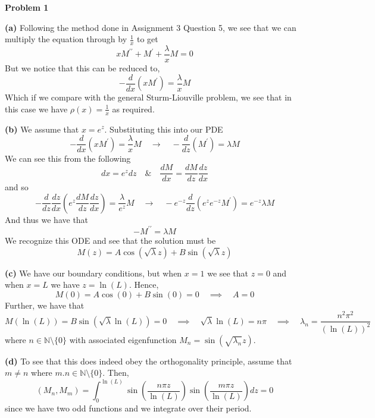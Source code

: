 \documentclass[10pt]{article}
\begin{document}
\textbf{Problem 1}

\textbf{(a)}
Following the method done in Assignment 3 Question 5, we see that we can multiply the equation through by $\frac{1}{x}$ to get
$$xM^{\prime\prime} + M^{\prime} + \frac{\lambda}{x}M = 0$$
But we notice that this can be reduced to,
$$-\frac{d}{dx}\left(xM^{\prime}\right) = \frac{\lambda}{x}M$$
Which if we compare with the general Sturm-Liouville problem, we see that in this case we have $\rho(x) = \frac{1}{x}$ as required.

\textbf{(b)}
We assume that $x = e^{z}$. Substituting this into our PDE
$$-\frac{d}{dx}(xM^{\prime}) = \frac{\lambda }{x}M \hspace{1em} \to \hspace{1em} -\frac{d}{dz}(M^{\prime}) = \lambda M$$
We can see this from the following
$$dx = e^{z}dz \hspace{1em} \& \hspace{1em} \frac{dM}{dx} = \frac{dM}{dz}\frac{dz}{dx}$$
and so
$$-\frac{d}{dz}\frac{dz}{dx}\left(e^{z}\frac{dM}{dz}\frac{dz}{dx}\right) = \frac{\lambda}{e^{z}}  M \hspace{1em} \to \hspace{1em} -e^{-z}\frac{d}{dz}(e^{z}e^{-z}M^{\prime}) = e^{-z}\lambda M$$
And thus we have that
$$-M^{\prime\prime} = \lambda M$$
We recognize this ODE and see that the solution must be
$$M(z) = A\cos(\sqrt{\lambda}z) + B\sin(\sqrt{\lambda}z)$$

\textbf{(c)}
We have our boundary conditions, but when $x =1$ we see that $z=0$ and when $x=L$ we have $z=\ln(L)$. Hence,
$$M(0) = A\cos(0) + B\sin(0) = 0 \hspace{1em} \implies \hspace{1em} A = 0$$
Further, we have that
$$M(\ln(L)) = B\sin(\sqrt{\lambda}\ln(L)) = 0 \hspace{1em} \implies \hspace{1em} \sqrt{\lambda}\ln(L) = n\pi \hspace{1em} \implies \hspace{1em} \lambda_{n} = \frac{n^{2}\pi^{2}}{(\ln(L))^{2}}$$
where $n \in \mathbb{N} \setminus \{0\}$ with associated eigenfunction $M_{n} = \sin(\sqrt{\lambda_{n}}z)$.

\textbf{(d)}
To see that this does indeed obey the orthogonality principle, assume that $m \neq n$ where $m.n\in \mathbb{N}\setminus \{0\}$. Then,
$$(M_{n},M_{m}) = \int_{0}^{\ln(L)}\sin\left(\frac{n\pi z}{\ln(L)}\right)\sin\left(\frac{m\pi z}{\ln(L)}\right)dz = 0$$
since we have two odd functions and we integrate over their period.
\end{document}
